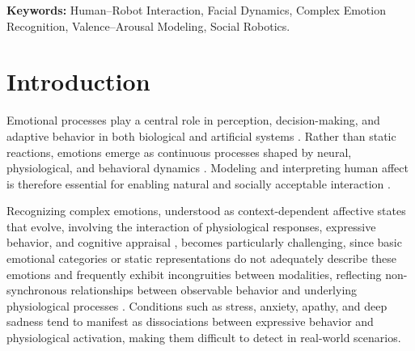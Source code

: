 \documentclass[letterpaper, 10 pt, conference]{ieeeconf}  %
\begin{document}
\begin{abstract}
In natural social interaction, emotions manifest as brief, low-intensity facial muscle activations that robotic systems must interpret under varying perceptual conditions. This challenge becomes more difficult when dealing with complex emotional states, since they are not manifested in stable facial patterns but in subtle variations over time. This work proposes a computational architecture for temporal modeling of facial dynamics to assist in inferring complex emotions in Human-Robot Interaction (HRI). The system processes continuous streams of facial video and represents muscle activity using blendshape coefficients. These signals are mapped onto a Valence–Arousal dimensional representation derived from facial activity, and their temporal integration allows the inference of complex emotional states such as stress, anxiety, deep sadness, and apathy. The proposed architecture was designed to operate on both robotic platforms and standard visual acquisition configurations. The experimental evaluation focuses on the perceptual component under real-time conditions, demonstrating that the architecture produces consistent affective estimates in uncontrolled environments. These results provide initial evidence of the approach's viability and establish a basis for validation in human-robot interaction scenarios.
\end{abstract}

\bigskip
\noindent\textbf{Keywords:}
Human–Robot Interaction, Facial Dynamics, Complex Emotion Recognition, Valence–Arousal Modeling, Social Robotics.


\section{Introduction}
Emotional processes play a central role in perception, decision-making, and adaptive behavior in both biological and artificial systems \cite{Damasio1994Descartes, Posner2005Circumplex}. Rather than static reactions, emotions emerge as continuous processes shaped by neural, physiological, and behavioral dynamics \cite{Scherer2005Emotion}. Modeling and interpreting human affect is therefore essential for enabling natural and socially acceptable interaction \cite{Afzal2023AffectiveComputing}.

Recognizing complex emotions, understood as context-dependent affective states that evolve, involving the interaction of physiological responses, expressive behavior, and cognitive appraisal \cite{Scherer2005Emotion}, becomes particularly challenging, since basic emotional categories or static representations do not adequately describe these emotions and frequently exhibit incongruities between modalities, reflecting non-synchronous relationships between observable behavior and underlying physiological processes \cite{jaiswal2019multimodal}. Conditions such as stress, anxiety, apathy, and deep sadness tend to manifest as dissociations between expressive behavior and physiological activation, making them difficult to detect in real-world scenarios.
\end{document}
